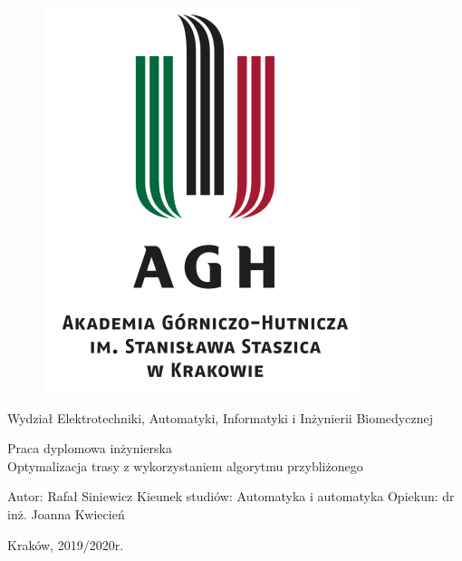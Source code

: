 \documentclass[a4paper, twoside, 12pt, justified]{article}
\begin{document}
	
	\begin{figure}[t]
		\includegraphics[scale=0.8]{AGH}
		\centering
	\end{figure}
	
	\begin{center}
		Wydział Elektrotechniki, Automatyki, Informatyki i Inżynierii Biomedycznej 
		\vspace{10mm} %
	
		Praca dyplomowa inżynierska \\ 
		\vspace{10mm}
		Optymalizacja trasy z wykorzystaniem algorytmu przybliżonego
	\end{center}
	
	\vfill
	\begin{flushleft}
		Autor: Rafał Siniewicz \newline
		Kieunek studiów: Automatyka i automatyka \newline 
		Opiekun: dr inż. Joanna Kwiecień \newline
	
	\end{flushleft}
	
	\begin{center}Kraków, 2019/2020r.\end{center}
	
	\newpage
	
\end{document}
